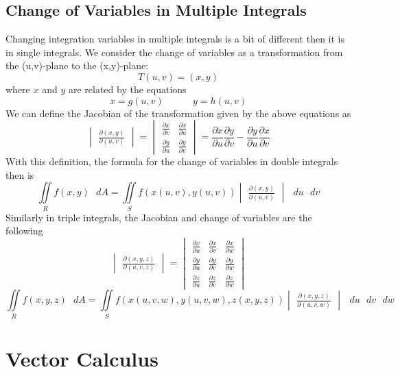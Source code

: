 \documentclass[11pt]{article}
\begin{document}
\subsection{Change of Variables in Multiple Integrals}
Changing integration variables in multiple integrals is a bit of different then it is in single integrals. We consider the change of variables as a transformation from the (u,v)-plane to the (x,y)-plane:
$$ T(u,v) = (x,y)$$ where $x$ and $y$ are related by the equations
$$ x = g(u,v) \quad \quad \quad y=h(u,v)$$
We can define the Jacobian of the transformation given by the above equations as 
$$\begin{vmatrix}
\frac{\partial(x,y)}{\partial(u,v)}
\end{vmatrix} = \begin{vmatrix}
\frac{\partial x}{\partial v} & \frac{\partial x}{\partial u} \\
\frac{\partial y}{\partial u} & \frac{\partial y}{\partial v}
\end{vmatrix} = \frac{\partial x}{\partial u} \frac{\partial y}{\partial v} - \frac{\partial y}{\partial u} \frac{\partial x}{\partial v}
$$
With this definition, the formula for the change of variables in double integrals then is 
$$\iint\limits_{R} f(x,y)\text{ }dA = \iint\limits_{S} f(x(u,v),y(u,v))\begin{vmatrix}
\frac{\partial(x,y)}{\partial(u,v)}
\end{vmatrix}\text{ }du \text{ } dv$$
Similarly in triple integrals, the Jacobian and change of variables are the following
$$\begin{vmatrix}
\frac{\partial(x,y,z)}{\partial(u,v,z)}
\end{vmatrix} = \begin{vmatrix}
\frac{\partial x}{\partial u} & \frac{\partial x}{\partial v} & \frac{\partial x}{\partial w}  \\
\frac{\partial y}{\partial u} & \frac{\partial y}{\partial v}  & \frac{\partial y}{\partial w}  \\
\frac{\partial z}{\partial u} & \frac{\partial z}{\partial v} & \frac{\partial z}{\partial w} 
\end{vmatrix}
$$
$$\iint\limits_{R} f(x,y,z)\text{ }dA = \iint\limits_{S} f(x(u,v,w),y(u,v,w), z(x,y,z))\begin{vmatrix}
\frac{\partial(x,y,z)}{\partial(u,v,w)}
\end{vmatrix}\text{ }du \text{ } dv \text{ } dw$$

\pagebreak

\section{Vector Calculus}
\end{document}
